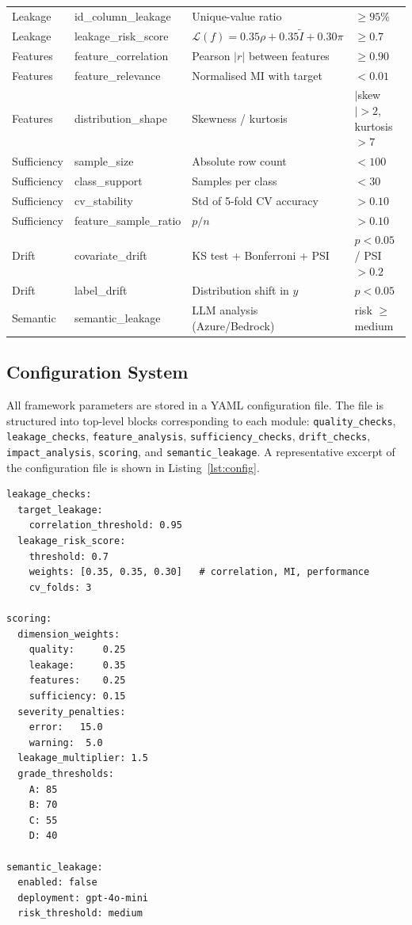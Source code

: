 \documentclass[12pt,a4paper]{report}
\begin{document}
\begin{longtable}{llll}
Leakage     & id\_column\_leakage    & Unique-value ratio          & $\ge 95\%$ \\
Leakage     & leakage\_risk\_score   & $\mathcal{L}(f) = 0.35\rho + 0.35\tilde{I} + 0.30\pi$ & $\ge 0.7$ \\
\midrule
Features    & feature\_correlation   & Pearson $|r|$ between features & $\ge 0.90$ \\
Features    & feature\_relevance     & Normalised MI with target   & $< 0.01$ \\
Features    & distribution\_shape    & Skewness / kurtosis         & $|$skew$|{>}2$, kurtosis${>}7$ \\
\midrule
Sufficiency & sample\_size           & Absolute row count          & $<100$ \\
Sufficiency & class\_support         & Samples per class           & $<30$ \\
Sufficiency & cv\_stability          & Std of 5-fold CV accuracy   & $>0.10$ \\
Sufficiency & feature\_sample\_ratio & $p/n$                       & $>0.10$ \\
\midrule
Drift       & covariate\_drift       & KS test + Bonferroni + PSI  & $p<0.05$ / PSI$>0.2$ \\
Drift       & label\_drift           & Distribution shift in $y$   & $p<0.05$ \\
\midrule
Semantic    & semantic\_leakage      & LLM analysis (Azure/Bedrock)& risk $\ge$ medium \\
\end{longtable}
\normalsize

\subsection{Configuration System}

All framework parameters are stored in a YAML configuration file.  The file is structured
into top-level blocks corresponding to each module: \texttt{quality\_checks},
\texttt{leakage\_checks}, \texttt{feature\_analysis}, \texttt{sufficiency\_checks},
\texttt{drift\_checks}, \texttt{impact\_analysis}, \texttt{scoring}, and
\texttt{semantic\_leakage}.  A representative excerpt of the configuration file is shown
in Listing~\ref{lst:config}.

\begin{lstlisting}[caption={Excerpt from configs/config.yaml showing configurable parameters.},label={lst:config}]
leakage_checks:
  target_leakage:
    correlation_threshold: 0.95
  leakage_risk_score:
    threshold: 0.7
    weights: [0.35, 0.35, 0.30]   # correlation, MI, performance
    cv_folds: 3

scoring:
  dimension_weights:
    quality:     0.25
    leakage:     0.35
    features:    0.25
    sufficiency: 0.15
  severity_penalties:
    error:   15.0
    warning:  5.0
  leakage_multiplier: 1.5
  grade_thresholds:
    A: 85
    B: 70
    C: 55
    D: 40

semantic_leakage:
  enabled: false
  deployment: gpt-4o-mini
  risk_threshold: medium
\end{lstlisting}
\end{document}
